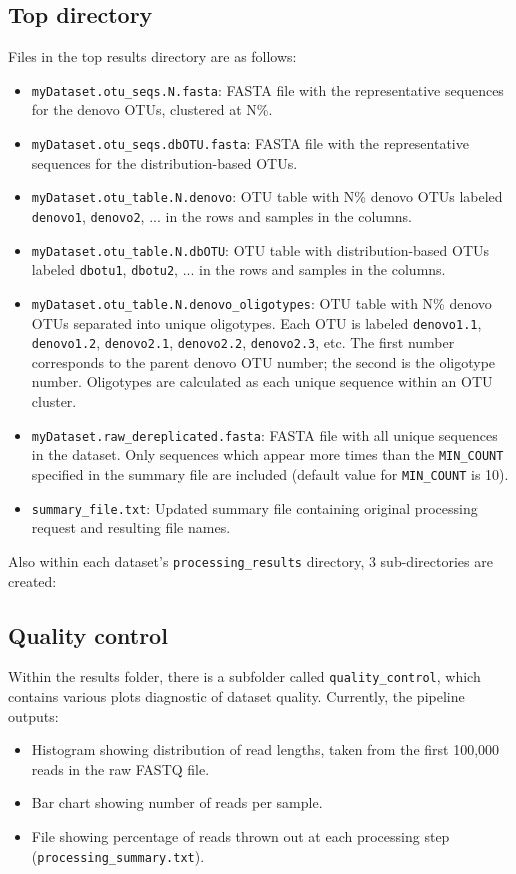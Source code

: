 \documentclass[11pt, oneside]{article}   	%
\begin{document}
\subsection{Top directory}
Files in the top results directory are as follows:
\begin{itemize}
	\item {\tt myDataset.otu\_seqs.N.fasta}: FASTA file with the representative sequences for the denovo OTUs, clustered at N\%.
	\item {\tt myDataset.otu\_seqs.dbOTU.fasta}: FASTA file with the representative sequences for the distribution-based OTUs.
	\item {\tt myDataset.otu\_table.N.denovo}: OTU table with N\% denovo OTUs labeled 
		{\tt denovo1}, {\tt denovo2}, ... in the rows and samples in the columns.
	\item {\tt myDataset.otu\_table.N.dbOTU}: OTU table with distribution-based OTUs labeled 
		{\tt dbotu1}, {\tt dbotu2}, ... in the rows and samples in the columns.
	\item {\tt myDataset.otu\_table.N.denovo\_oligotypes}: OTU table with N\% denovo 
		OTUs separated into unique oligotypes. Each OTU is labeled {\tt denovo1.1}, 
		{\tt denovo1.2}, {\tt denovo2.1}, {\tt denovo2.2}, {\tt denovo2.3}, etc. 
		The first number corresponds to the parent denovo OTU number; the second 
		is the oligotype number. Oligotypes are calculated as each unique sequence 
		within an OTU cluster.
	\item {\tt myDataset.raw\_dereplicated.fasta}: FASTA file with all unique 
		sequences in the dataset. Only sequences which appear more times than the {\tt MIN\_COUNT} 
		specified in the summary file are included (default value for {\tt MIN\_COUNT} is 10).
	\item {\tt summary\_file.txt}: Updated summary file containing original processing request and resulting file names.
\end{itemize}

Also within each dataset's {\tt processing\_results} directory, 3 sub-directories are created:

\subsection{Quality control}
Within the results folder, there is a subfolder called {\tt quality\_control}, which contains various plots diagnostic of dataset quality.  Currently, the pipeline outputs:
\begin{itemize}
	\item Histogram showing distribution of read lengths, taken from the first 100,000 reads in the raw FASTQ file.
	\item Bar chart showing number of reads per sample.
	\item File showing percentage of reads thrown out at each processing step 
	({\tt processing\_summary.txt}). 
\end{itemize}
\end{document}
